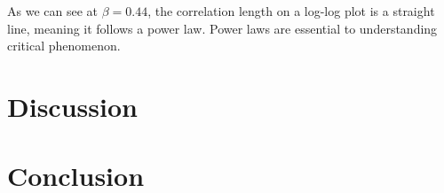 \documentclass{article}
\begin{document}
As we can see at $\beta=0.44$, the correlation length on a log-log plot is a straight line, meaning it follows
a power law. Power laws are essential to understanding critical phenomenon. 


\section{Discussion}

\section{Conclusion}
\end{document}

